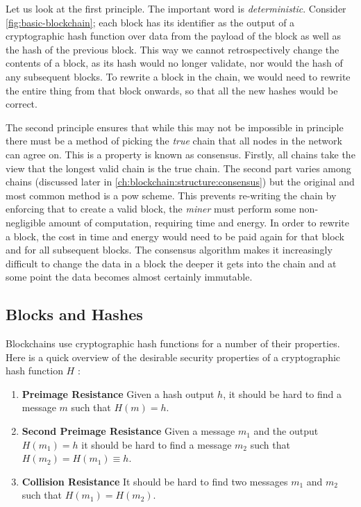 Let us look at the first principle. The important word is \emph{deterministic}. Consider \autoref{fig:basic-blockchain}; each block has its identifier as the output of a cryptographic hash function over data from the payload of the block as well as the hash of the previous block. This way we cannot retrospectively change the contents of a block, as its hash would no longer validate, nor would the hash of any subsequent blocks. To rewrite a block in the chain, we would need to rewrite the entire thing from that block onwards, so that all the new hashes would be correct.

The second principle ensures that while this may not be impossible in principle there must be a method of picking the \emph{true} chain that all nodes in the network can agree on. This is a property is known as consensus. Firstly, all chains take the view that the longest valid chain is the true chain. The second part varies among chains (discussed later in \autoref{ch:blockchain:structure:consensus}) but the original and most common method is a \gls{pow} scheme. This prevents re-writing the chain by enforcing that to create a valid block, the \emph{miner} must perform some non-negligible amount of computation, requiring time and energy. In order to rewrite a block, the cost in time and energy would need to be paid again for that block and for all subsequent blocks. The consensus algorithm makes it increasingly difficult to change the data in a block the deeper it gets into the chain and at some point the data becomes almost certainly immutable.

\subsection{Blocks and Hashes}
\label{ch:blockchain:structure:basics}

Blockchains use cryptographic hash functions for a number of their properties. Here is a quick overview of the desirable security properties of a cryptographic hash function $H$ \cite{martinEverydayCryptography2017}:

\begin{enumerate}
    \item \textbf{Preimage Resistance} Given a hash output $h$, it should be hard to find a message $m$ such that $H(m) = h$.
    \item \textbf{Second Preimage Resistance} Given a message $m_1$ and the output $H(m_1) = h$ it should be hard to find a message $m_2$ such that $H(m_2) = H(m_1) \equiv h$.
    \item \textbf{Collision Resistance} It should be hard to find two messages $m_1$ and $m_2$ such that $H(m_1) = H(m_2)$.
\end{enumerate}

